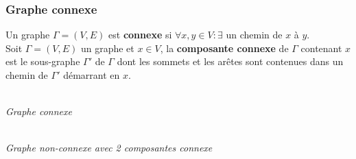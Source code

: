 \documentclass[11pt]{article}
\begin{document}
		\subsubsection{Graphe connexe}
            		Un graphe $\Gamma=(V,E)$ est \textbf{connexe} si $\forall x,y \in V : \exists$ un chemin de $x$ à $y$.\\
            		
            		Soit $\Gamma = (V,E)$ un graphe et $x \in V$, la \textbf{composante connexe} de $\Gamma$ contenant $x$ est le sous-graphe $\Gamma '$ de $\Gamma$ dont les sommets et les arêtes sont contenues dans un chemin de $\Gamma '$ démarrant en $x$.\\ %
            		
            		\begin{minipage}{0.5\textwidth}
            			\centering
            			 \\
            			\textit{Graphe connexe}
            			\end{minipage}\hfill
            			\begin{minipage}{0.5\textwidth}
            			\centering
            			 \\
            			\textit{Graphe non-connexe avec 2 composantes connexe}
            			\end{minipage}
			
\end{document}
